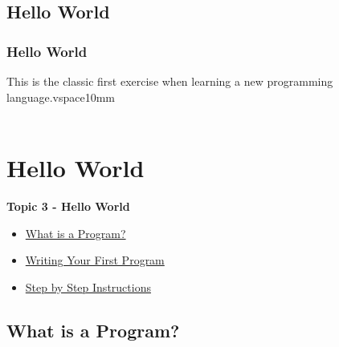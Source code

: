 \documentclass[fleqn]{ltx-talk} %
\newcommand{\sectionIIItitle}{Hello World}
\newcommand{\sectionIIsubsectionIVtitle}{Hello World}
\newcommand{\sectionIIIsubsectionItitle}{What is a Program?}
\newcommand{\sectionIIIsubsectionIItitle}{Writing Your First Program}
\newcommand{\sectionIIIsubsectionIIItitle}{Step by Step Instructions}
\newcommand{\sectionIIIsubsectionIVtitle}{-}
\begin{document}
		\subsection{\sectionIIsubsectionIVtitle}\label{sectionIIsubsectionIV}

			\begin{frame}
				\frametitle{\sectionIIsubsectionIVtitle}

				This is the classic first exercise when learning a new programming language.vspace{10mm}\\

				 \vspace{3mm}\\

				\btVFill 
			\end{frame}
 
	\section{\sectionIIItitle}\label{sectionIII}

		\begin{frame}
			\large \textbf{Topic 3 - \sectionIIItitle} \vspace{3mm}\\

			\begin{itemize}
				\item \hyperlink{sectionIIIsubsectionI}{\sectionIIIsubsectionItitle} \vspc %
				\item \hyperlink{sectionIIIsubsectionII}{\sectionIIIsubsectionIItitle} \vspc %
				\item \hyperlink{sectionIIIsubsectionIII}{\sectionIIIsubsectionIIItitle} \vspc %
			\end{itemize}

		\end{frame}

		\subsection{\sectionIIIsubsectionItitle}\label{sectionIIIsubsectionI}
\end{document}
